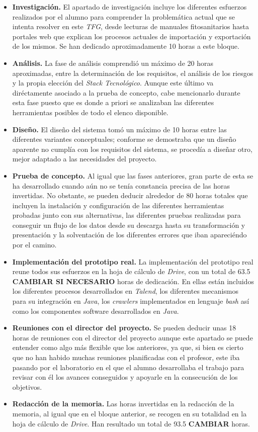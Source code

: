 \begin{itemize}
\item \textbf{Investigación. } El apartado de investigación incluye los diferentes esfuerzos realizados por el alumno para comprender la problemática actual que se intenta resolver en este \textit{TFG}, desde lecturas de manuales fitosanitarios hasta portales web que explican los procesos actuales de importación y exportación de los mismos. Se han dedicado aproximadamente 10 horas a este bloque.
\item \textbf{Análisis. } La fase de análisis comprendió un máximo de 20 horas aproximadas, entre la determinación de los requisitos, el análisis de los riesgos y la propia elección del \textit{Stack Tecnológico}. Aunque este último va diréctamente asociado a la prueba de concepto, cabe mencionarlo durante esta fase puesto que es donde a priori se analizaban las diferentes herramientas posibles de todo el elenco disponible. 
\item \textbf{Diseño. } El diseño del sistema tomó un máximo de 10 horas entre las diferentes variantes conceptuales; conforme se demostraba que un diseño aparente no cumplía con los requisitos del sistema, se procedía a diseñar otro, mejor adaptado a las necesidades del proyecto. 
\item \textbf{Prueba de concepto. } Al igual que las fases anteriores, gran parte de esta se ha desarrollado cuando aún no se tenía constancia precisa de las horas invertidas. No obstante, se pueden deducir alrededor de 80 horas totales que incluyen la instalación y configuración de las diferentes herramientas probadas junto con sus alternativas, las diferentes pruebas realizadas para conseguir un flujo de los datos desde su descarga hasta su transformación y presentación y la solventación de los diferentes errores que iban apareciéndo por el camino. 
\item \textbf{Implementación del prototipo real. } La implementación del prototipo real reune todos sus esfuerzos en la hoja de cálculo de \textit{Drive}, con un total de 63.5 \textbf{CAMBIAR SI NECESARIO} horas de dedicación. En ellas están incluidos los diferentes procesos desarrollados en \textit{Talend}, los diferentes mecanismos para su integración en \textit{Java}, los \textit{crawlers} implementados en lenguaje \textit{bash} así como los  componentes software desarrollados en \textit{Java}. 
\item \textbf{Reuniones con el director del proyecto. } Se pueden deducir unas 18 horas de reuniones con el director del proyecto aunque este apartado se puede entender como algo más flexible que los anteriores, ya que, si bien es cierto que no han habido muchas reuniones planificadas con el profesor, este iba pasando por el laboratorio en el que el alumno desarrollaba el trabajo para revisar con él los avances conseguidos y apoyarle en la consecución de los objetivos. 
\item \textbf{Redacción de la memoria. } Las horas invertidas en la redacción de la memoria, al igual que en el bloque anterior, se recogen en su totalidad en la hoja de cálculo de \textit{Drive}. Han resultado un total de 93.5 \textbf{CAMBIAR} horas.
\end{itemize}

